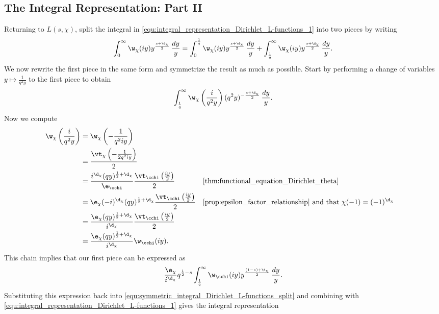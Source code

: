     \subsection*{The Integral Representation: Part II}
      Returning to \(L(s,\chi)\), split the integral in \cref{equ:integral_representation_Dirichlet_L-functions_1} into two pieces by writing
      \begin{equation}\label{equ:symmetric_integral_Dirichlet_L-functions_split}
        \int_{0}^{\infty}\w_{\chi}(iy)y^{\frac{s+\d_{\chi}}{2}}\,\frac{dy}{y} = \int_{0}^{\frac{1}{q}}\w_{\chi}(iy)y^{\frac{s+\d_{\chi}}{2}}\,\frac{dy}{y}+\int_{\frac{1}{q}}^{\infty}\w_{\chi}(iy)y^{\frac{s+\d_{\chi}}{2}}\,\frac{dy}{y}.
      \end{equation}
      We now rewrite the first piece in the same form and symmetrize the result as much as possible. Start by performing a change of variables \(y \mapsto \frac{1}{q^{2}y}\) to the first piece to obtain
      \[
        \int_{\frac{1}{q}}^{\infty}\w_{\chi}\left(\frac{i}{q^{2}y}\right)(q^{2}y)^{-\frac{s+\d_{\chi}}{2}}\,\frac{dy}{y}.
      \]
      Now we compute
      \begin{align*}
        \w_{\chi}\left(\frac{i}{q^{2}y}\right) &= \w_{\chi}\left(-\frac{1}{q^{2}iy}\right) \\
        &= \frac{\vt_{\chi}\left(-\frac{1}{2q^{2}iy}\right)}{2} \\
        &= \frac{i^{\d_{\chi}}(qy)^{\frac{1}{2}+\d_{\chi}}}{\e_{\cchi}}\frac{\vt_{\cchi}\left(\frac{iy}{2}\right)}{2} && \text{\cref{thm:functional_equation_Dirichlet_theta}} \\
        &= \e_{\chi}(-i)^{\d_{\chi}}(qy)^{\frac{1}{2}+\d_{\chi}}\frac{\vt_{\cchi}\left(\frac{iy}{2}\right)}{2} && \text{\cref{prop:epsilon_factor_relationship} and that \(\chi(-1) = (-1)^{\d_{\chi}}\)} \\
        &= \frac{\e_{\chi}(qy)^{\frac{1}{2}+\d_{\chi}}}{i^{\d_{\chi}}}\frac{\vt_{\cchi}\left(\frac{iy}{2}\right)}{2} \\
        &= \frac{\e_{\chi}(qy)^{\frac{1}{2}+\d_{\chi}}}{i^{\d_{\chi}}}\w_{\cchi}(iy).
      \end{align*}
      This chain implies that our first piece can be expressed as
      \[
        \frac{\e_{\chi}}{i^{\d_{\chi}}}q^{\frac{1}{2}-s}\int_{\frac{1}{q}}^{\infty}\w_{\cchi}(iy)y^{\frac{(1-s)+\d_{\chi}}{2}}\,\frac{dy}{y}.
      \]
      Substituting this expression back into \cref{equ:symmetric_integral_Dirichlet_L-functions_split} and combining with \cref{equ:integral_representation_Dirichlet_L-functions_1} gives the integral representation
